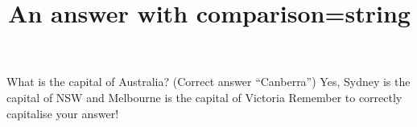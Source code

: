 \documentclass[hidesidemenu]{webquiz}
\title{An answer with comparison=string}
\begin{document}
  \begin{question}     %
     What is the capital of Australia?
      (Correct answer ``Canberra'')
     \whenRight  Yes, Sydney is the capital of NSW and Melbourne is the
     capital of Victoria
     \whenWrong Remember to correctly capitalise your answer!
  \end{question}
\end{document}
